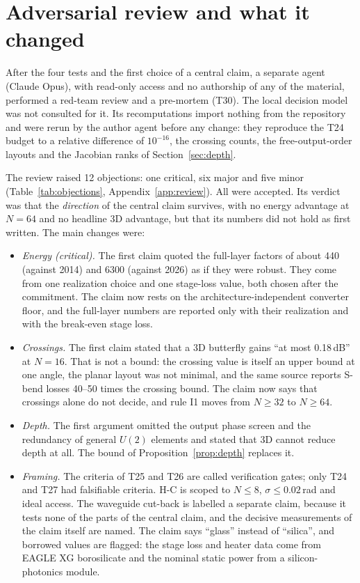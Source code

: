 \documentclass[11pt,a4paper]{article}
\newcommand{\dB}{\,dB\xspace}
\begin{document}
\section{Adversarial review and what it changed}
\label{sec:review}

After the four tests and the first choice of a central claim, a separate agent (Claude Opus), with read-only access and no authorship of any of the material, performed a red-team review and a pre-mortem (T30). The local decision model was not consulted for it. Its recomputations import nothing from the repository and were rerun by the author agent before any change: they reproduce the T24 budget to a relative difference of $10^{-16}$, the crossing counts, the free-output-order layouts and the Jacobian ranks of Section~\ref{sec:depth}.

The review raised 12 objections: one critical, six major and five minor (Table~\ref{tab:objections}, Appendix~\ref{app:review}). All were accepted. Its verdict was that the \emph{direction} of the central claim survives, with no energy advantage at $N=64$ and no headline 3D advantage, but that its numbers did not hold as first written. The main changes were:
\begin{itemize}
\item \emph{Energy (critical).} The first claim quoted the full-layer factors of about 440 (against 2014) and 6300 (against 2026) as if they were robust. They come from one realization choice and one stage-loss value, both chosen after the commitment. The claim now rests on the architecture-independent converter floor, and the full-layer numbers are reported only with their realization and with the break-even stage loss.
\item \emph{Crossings.} The first claim stated that a 3D butterfly gains ``at most 0.18\dB'' at $N=16$. That is not a bound: the crossing value is itself an upper bound at one angle, the planar layout was not minimal, and the same source reports S-bend losses 40--50 times the crossing bound. The claim now says that crossings alone do not decide, and rule I1 moves from $N\ge32$ to $N\ge64$.
\item \emph{Depth.} The first argument omitted the output phase screen and the redundancy of general $U(2)$ elements and stated that 3D cannot reduce depth at all. The bound of Proposition~\ref{prop:depth} replaces it.
\item \emph{Framing.} The criteria of T25 and T26 are called verification gates; only T24 and T27 had falsifiable criteria. H-C is scoped to $N\le8$, $\sigma\le0.02$\,rad and ideal access. The waveguide cut-back is labelled a separate claim, because it tests none of the parts of the central claim, and the decisive measurements of the claim itself are named. The claim says ``glass'' instead of ``silica'', and borrowed values are flagged: the stage loss and heater data come from EAGLE XG borosilicate and the nominal static power from a silicon-photonics module.
\end{itemize}
\end{document}

